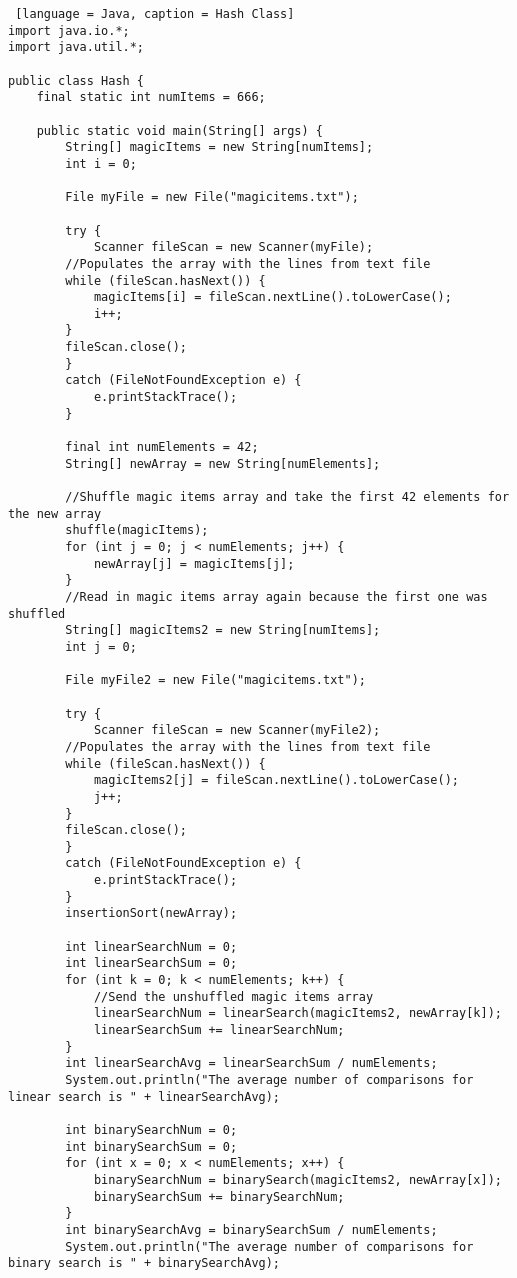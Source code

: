 \documentclass{article}
\begin{document}
\begin{lstlisting} [language = Java, caption = Hash Class]
import java.io.*;
import java.util.*;

public class Hash {
    final static int numItems = 666;

    public static void main(String[] args) {
        String[] magicItems = new String[numItems];
        int i = 0;

        File myFile = new File("magicitems.txt");

        try {
            Scanner fileScan = new Scanner(myFile);
        //Populates the array with the lines from text file
        while (fileScan.hasNext()) {
            magicItems[i] = fileScan.nextLine().toLowerCase();
            i++;
        }
        fileScan.close();            
        }
        catch (FileNotFoundException e) {
            e.printStackTrace();
        }

        final int numElements = 42;
        String[] newArray = new String[numElements];

        //Shuffle magic items array and take the first 42 elements for the new array
        shuffle(magicItems);
        for (int j = 0; j < numElements; j++) {
            newArray[j] = magicItems[j];
        }
        //Read in magic items array again because the first one was shuffled
        String[] magicItems2 = new String[numItems];
        int j = 0;

        File myFile2 = new File("magicitems.txt");

        try {
            Scanner fileScan = new Scanner(myFile2);
        //Populates the array with the lines from text file
        while (fileScan.hasNext()) {
            magicItems2[j] = fileScan.nextLine().toLowerCase();
            j++;
        }
        fileScan.close();            
        }
        catch (FileNotFoundException e) {
            e.printStackTrace();
        }
        insertionSort(newArray);

        int linearSearchNum = 0;
        int linearSearchSum = 0;
        for (int k = 0; k < numElements; k++) {
            //Send the unshuffled magic items array
            linearSearchNum = linearSearch(magicItems2, newArray[k]);
            linearSearchSum += linearSearchNum;
        }
        int linearSearchAvg = linearSearchSum / numElements;
        System.out.println("The average number of comparisons for linear search is " + linearSearchAvg);
        
        int binarySearchNum = 0;
        int binarySearchSum = 0;
        for (int x = 0; x < numElements; x++) {
            binarySearchNum = binarySearch(magicItems2, newArray[x]);
            binarySearchSum += binarySearchNum;
        }
        int binarySearchAvg = binarySearchSum / numElements;
        System.out.println("The average number of comparisons for binary search is " + binarySearchAvg);


\end{lstlisting}
\end{document}
